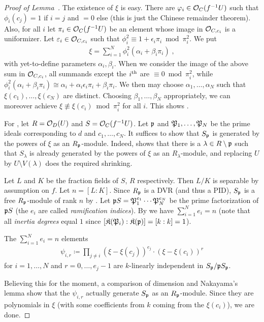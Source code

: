 \documentclass[a4paper,parskip=half,numbers=enddot, DIV=12]{scrreprt}
\begin{document}
\begin{proof}[Proof of Lemma~]
	The existence of $\xi$ is easy. There are $\varphi_i\in\mathcal{O}_C(f^{-1}U)$ such that $\phi_i(c_j)=1$ if $i=j$ and $=0$ else (this is just the Chinese remainder theorem). Also, for all $i$ let $\pi_i\in\mathcal{O}_C(f^{-1}U)$ be an element whose image in $\mathcal{O}_{C,c_i}$ is a uniformizer. Let $\varepsilon_i\in\mathcal{O}_{C,c_i}$ such that $\phi_i^2\equiv 1+\epsilon_i\pi_i\bmod\pi_i^2$. We put
	\begin{align*}
		\xi=\sum_{i=1}^N\phi_i^2(\alpha_i+\beta_i\pi_i)\;,
	\end{align*}
	with yet-to-define parameters $\alpha_i,\beta_i$. When we consider the image of the above sum in $\mathcal{O}_{C,c_i}$, all summands except the $i^{\text{th}}$ are $\equiv 0\bmod \pi_i^2$, while $\phi_i^2(\alpha_i+\beta_i\pi_i)\cong \alpha_i+\alpha_i\epsilon_i\pi_i+\beta_i\pi_i$. We then may choose $\alpha_1,\ldots,\alpha_N$ such that $\xi(c_1),\ldots,\xi(c_N)$ are distinct. Choosing $\beta_1,\ldots,\beta_N$ appropriately, we can moreover achieve $\xi\not\equiv\xi(c_i)\bmod \pi_i^2$ for all $i$. This shows .
	
	For , let $R=\mathcal{O}_D(U)$ and $S=\mathcal{O}_C(f^{-1}U)$. Let $\mathfrak{p}$ and $\mathfrak{P}_1,\ldots,\mathfrak{P}_N$ be the prime ideals corresponding to $d$ and $c_1,\ldots,c_N$. It suffices to show that $S_{\mathfrak{p}}$ is generated by the powers of $\xi$ as an $R_{\mathfrak{p}}$-module. Indeed, \cite[Lemma~1.5.1]{alg2} shows that there is a $\lambda\in R\setminus\mathfrak{p}$ such that $S_\lambda$ is already generated by the powers of $\xi$ as an $R_\lambda$-module, and replacing $U$ by $U\setminus V(\lambda)$ does the required shrinking.
	
	Let $L$ and $K$ be the fraction fields of $S$, $R$ respectively. Then $L/K$ is separable by assumption on $f$. Let $n=[L:K]$. Since $R_{\mathfrak{p}}$ is a DVR (and thus a PID), $S_{\mathfrak{p}}$ is a free $R_{\mathfrak{p}}$-module of rank $n$ by \cite[Ch.~I, (2.10)]{NEUKIRCH}. Let $\mathfrak{p} S=\mathfrak{P}_1^{e_1}\cdots \mathfrak{P}_N^{e_N}$ be the prime factorization of $\mathfrak{p} S$ (the $e_i$ are called \emph{ramification indices}). By \cite[Ch.~I, (8.2)]{NEUKIRCH} we have $\sum_{i=1}^Ne_i=n$ (note that all \emph{inertia degrees} equal $1$ since $[\mathfrak{K}(\mathfrak{P}_i):\mathfrak{K}(\mathfrak{p})]=[k:k]=1$). 
	\begin{claim}
		 The $\sum_{i=1}^Ne_i=n$ elements
		 \begin{align*}
			 \psi_{i,r}\coloneqq\prod_{j\neq i}\left(\xi-\xi(c_j)\right)^{e_j}\cdot \left(\xi-\xi(c_i)\right)^r
		 \end{align*}
		 for $i=1,\ldots,N$ and $r=0,\ldots,e_j-1$ are $k$-linearly independent in $S_{\mathfrak{p}}/\mathfrak{p} S_{\mathfrak{p}}$.
	\end{claim}
	Believing this for the moment, a comparison of dimension and Nakayama's lemma show that the $\psi_{i,r}$ actually generate $S_{\mathfrak{p}}$ as an $R_{\mathfrak{p}}$-module. Since they are polynomials in $\xi$ (with some coefficients from $k$ coming from the $\xi(c_i)$), we are done.
	

\end{proof}
\end{document}
